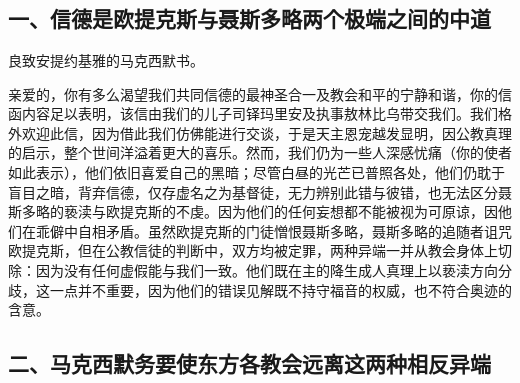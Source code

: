 

\section{}

\par


\subsection{一、信德是欧提克斯与聂斯多略两个极端之间的中道}

良致安提约基雅的马克西默书。\par

亲爱的，你有多么渴望我们共同信德的最神圣合一及教会和平的宁静和谐，你的信函内容足以表明，该信由我们的儿子司铎玛里安及执事敖林比乌带交我们。我们格外欢迎此信，因为借此我们仿佛能进行交谈，于是天主恩宠越发显明，因公教真理的启示，整个世间洋溢着更大的喜乐。然而，我们仍为一些人深感忧痛（你的使者如此表示），他们依旧喜爱自己的黑暗；尽管白昼的光芒已普照各处，他们仍耽于盲目之暗，背弃信德，仅存虚名之为基督徒，无力辨别此错与彼错，也无法区分聂斯多略的亵渎与欧提克斯的不虔。因为他们的任何妄想都不能被视为可原谅，因他们在乖僻中自相矛盾。虽然欧提克斯的门徒憎恨聂斯多略，聂斯多略的追随者诅咒欧提克斯，但在公教信徒的判断中，双方均被定罪，两种异端一并从教会身体上切除：因为没有任何虚假能与我们一致。他们既在主的降生成人真理上以亵渎方向分歧，这一点并不重要，因为他们的错误见解既不持守福音的权威，也不符合奥迹的含意。\par


\subsection{二、马克西默务要使东方各教会远离这两种相反异端}

